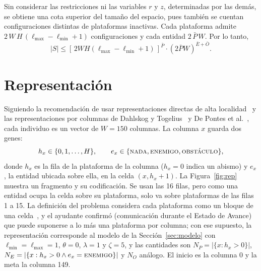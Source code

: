 \documentclass[letter, 10pt]{article}
\begin{document}
Sin considerar las restricciones ni las variables $r$ y $z$, determinadas por las dem\'as, se obtiene una cota superior del tama\~no del espacio, pues tambi\'en se cuentan configuraciones distintas de plataformas inactivas. Cada plataforma admite $2\,W\,H\,(\ell_{\max}-\ell_{\min}+1)$ configuraciones y cada entidad $2\,\bar{P}\,W$. Por lo tanto,
\begin{equation}
|S| \leq \left[\,2WH(\ell_{\max}-\ell_{\min}+1)\,\right]^{\bar{P}} \cdot \left(2\bar{P}W\right)^{\bar{E}+\bar{O}}.
\end{equation}

\section{Representaci\'on}\label{sec:rep}
Siguiendo la recomendaci\'on de usar representaciones directas de alta localidad~\cite{Togelius2011} y las representaciones por columnas de Dahlskog y Togelius~\cite{Dahlskog2013} y De Pontes et al.~\cite{DePontes2022}, cada individuo es un vector de $W=150$ columnas. La columna $x$ guarda dos genes:
\[ h_x\in\{0,1,\dots,H\},\qquad e_x\in\{\textsc{nada},\textsc{enemigo},\textsc{obst\'aculo}\}, \]
donde $h_x$ es la fila de la plataforma de la columna ($h_x=0$ indica un abismo) y $e_x$, la entidad ubicada sobre ella, en la celda $(x,h_x+1)$. La Figura~\ref{fig:rep} muestra un fragmento y su codificaci\'on. Se usan las 16 filas, pero como una entidad ocupa la celda sobre su plataforma, solo va sobre plataformas de las filas 1 a 15. La definici\'on del problema considera cada plataforma como un bloque de una celda~\cite{Saavedra2026}, y el ayudante confirm\'o (comunicaci\'on durante el Estado de Avance) que puede suponerse a lo m\'as una plataforma por columna; con ese supuesto, la representaci\'on corresponde al modelo de la Secci\'on~\ref{sec:modelo} con $\ell_{\min}=\ell_{\max}=1$, $\theta=0$, $\lambda=1$ y $\zeta=5$, y las cantidades son $N_P=|\{x:h_x>0\}|$, $N_E=|\{x:h_x>0\wedge e_x=\textsc{enemigo}\}|$ y $N_O$ an\'alogo. El inicio es la columna 0 y la meta la columna 149.
\end{document}
